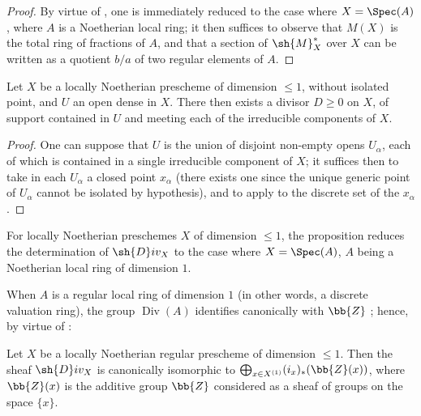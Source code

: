 \begin{proof}
By virtue of , one is immediately reduced to the case where $X=\Spec(A)$, where $A$ is a Noetherian local ring;
it then suffices to observe that $M(X)$ is the total ring of fractions of $A$, and that a section of $\sh{M}_X^*$ over $X$ can be written as a quotient $b/a$ of two regular elements of $A$.
\end{proof}

\begin{corollary}[21.9.7]
\label{IV.21.9.7}
Let $X$ be a locally Noetherian prescheme of dimension $\leq 1$, without isolated point, and $U$ an open dense in $X$.
There then exists a divisor $D\geq 0$ on $X$, of support contained in $U$ and meeting each of the irreducible components of $X$.
\end{corollary}

\begin{proof}
One can suppose that $U$ is the union of disjoint non-empty opens $U_\alpha$, each of which is contained in a single irreducible component of $X$;
it suffices then to take in each $U_\alpha$ a closed point $x_\alpha$ (there exists one since the unique generic point of $U_\alpha$ cannot be isolated by hypothesis), and to apply  to the discrete set of the $x_\alpha$.
\end{proof}

\begin{env}[21.9.8]
\label{IV.21.9.8}
For locally Noetherian preschemes $X$ of dimension $\leq 1$, the proposition  reduces the determination of $\sh{D}iv_X$ to the case where $X=\Spec(A)$, $A$ being a Noetherian local ring of dimension $1$.

When $A$ is a regular local ring of dimension $1$ (in other words, a discrete valuation ring), the group $\operatorname{Div}(A)$ identifies canonically with $\bb{Z}$ ;
hence, by virtue of :
\end{env}

\begin{proposition}[21.9.9]
\label{IV.21.9.9}
Let $X$ be a locally Noetherian regular prescheme of dimension $\leq 1$.
Then the sheaf $\sh{D}iv_X$ is canonically isomorphic to $\bigoplus_{x\in X^{(1)}}(i_x)_*(\bb{Z}(x))$, where $\bb{Z}(x)$ is the additive group $\bb{Z}$ considered as a sheaf of groups on the space $\{x\}$.
\end{proposition}

